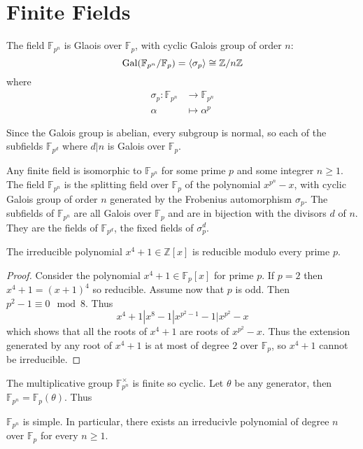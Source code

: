 \documentclass[a4paper]{article}
\begin{document}
\section{Finite Fields}

The field $\mathbb F_{p^n}$ is Glaois over $\mathbb F_p$, with cyclic Galois group of order $n$:
\[
  \gal(\mathbb F_{p^n} / \mathbb F_p) = \langle\sigma_p\rangle \cong \mathbb{Z}/n\mathbb{Z}
\]
where
\begin{align*}
  \sigma_p : \mathbb F_{p^n} & \rightarrow \mathbb F_{p^n} \\
  \alpha & \mapsto \alpha^p
\end{align*}

Since the Galois group is abelian, every subgroup is normal, so each of the subfields $\mathbb F_{p^d}$ where $d|n$ is Galois over $\mathbb F_p$.

\begin{proposition}
  Any finite field is isomorphic to $\mathbb F_{p^n}$ for some prime $p$ and some integrer $n \geq 1$. The field $\mathbb F_{p^n}$ is the splitting field over $\mathbb F_p$ of the polynomial $x^{p^n}-x$, with cyclic Galois group of order $n$ generated by the Frobenius automorphism $\sigma_p$. The subfields of $\mathbb F_{p^n}$ are all Galois over $\mathbb F_p$ and are in bijection with the divisors $d$ of $n$. They are the fields of $\mathbb F_{p^d}$, the fixed fields of $\sigma^d_p$.
\end{proposition}

\begin{corollary}
  The irreducible polynomial $x^4+1 \in \mathbb{Z}[x]$ is reducible modulo every prime $p$.
\end{corollary}

\begin{proof}
  Consider the polynomial $x^4+1 \in \mathbb F_p[x]$ for prime $p$. If $p = 2$ then $x^4 + 1 = (x+1)^4$ so reducible. Assume now that $p$ is odd. Then $p^2-1 \equiv 0 \mod 8$. Thus
  \[
    x^4+1 | x^8-1 | x^{p^2-1}-1 | x^{p^2}-x
  \]
  which shows that all the roots of $x^4+1$ are roots of $x^{p^2}-x$. Thus the extension generated by any root of $x^4+1$ is at most of degree $2$ over $\mathbb F_p$, so $x^4+1$ cannot be irreducible.
\end{proof}

The multiplicative group $\mathbb F_{p^n}^\times$ is finite so cyclic. Let $\theta$ be any generator, then $\mathbb F_{p^n} = \mathbb F_p(\theta)$. Thus

\begin{proposition}
  $\mathbb F_{p^n}$ is simple. In particular, there exists an irreducivle polynomial of degree $n$ over $\mathbb F_p$ for every $n \geq 1$.
\end{proposition}
\end{document}

